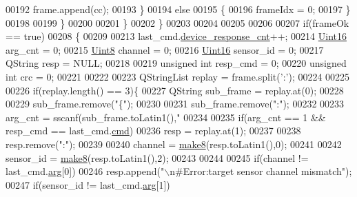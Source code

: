 \begin{DoxyCode}
{00192                                        frame.append(cc);
00193                                    \}
00194                                    \textcolor{keywordflow}{else}
00195                                    \{
00196                                        frameIdx = 0;
00197                                    \}
00198 
00199                       \}
00200 
00201                  \}
00202             \}
00203        
00204 
00205 
00206 
00207         \textcolor{keywordflow}{if}(frameOk == \textcolor{keyword}{true})
00208         \{
00209 
00213             last\_cmd.\hyperlink{a00004_a2b37e66e2555cf1dc26439ad7c30ea78}{device\_response\_cnt}++;
00214             \hyperlink{a00004_aae7407b021d43f7193a81a58cfb3e297}{Uint16}  arg\_cnt      =   0;
00215             \hyperlink{a00004_a979e3e23b9a449e69ab6a8a83b6042f8}{Uint8}   channel      =   0;
00216             \hyperlink{a00004_aae7407b021d43f7193a81a58cfb3e297}{Uint16}  sensor\_id    =   0;
00217             QString resp         =   NULL;
00218 
00219             \textcolor{keywordtype}{unsigned} \textcolor{keywordtype}{int}  resp\_cmd     =   0;
00220             \textcolor{keywordtype}{unsigned} \textcolor{keywordtype}{int}  crc          =   0;
00221 
00222 
00223           QStringList replay     = frame.split(\textcolor{charliteral}{':'});
00224 
00225 
00226           \textcolor{keywordflow}{if}(replay.length() == 3)\{
00227           QString     sub\_frame  = replay.at(0);
00228 
00229           sub\_frame.remove(\textcolor{stringliteral}{"\{"});
00230 
00231           sub\_frame.remove(\textcolor{stringliteral}{":"});
00232 
00233           arg\_cnt = sscanf(sub\_frame.toLatin1(),\textcolor{stringliteral}{"%
00234 
00235           \textcolor{keywordflow}{if}(arg\_cnt == 1 && resp\_cmd == last\_cmd.\hyperlink{a00004_af20664dc9ca2b752c73d524edee0e07a}{cmd})
00236               resp = replay.at(1);
00237 
00238           resp.remove(\textcolor{stringliteral}{":"});
00239 
00240           channel    = \hyperlink{a00017_aebce94d5e6af7afff661daf74b208de1}{make8}(resp.toLatin1(),0);
00241 
00242           sensor\_id  = \hyperlink{a00017_aebce94d5e6af7afff661daf74b208de1}{make8}(resp.toLatin1(),2);
00243 
00244 
00245           \textcolor{keywordflow}{if}(channel != last\_cmd.\hyperlink{a00004_a56e6c2d7315d0ae60a51e8b140c9cfe4}{arg}[0])
00246               resp.append(\textcolor{stringliteral}{"\(\backslash\)n#Error:target sensor channel mismatch"});
00247           \textcolor{keywordflow}{if}(sensor\_id != last\_cmd.\hyperlink{a00004_a56e6c2d7315d0ae60a51e8b140c9cfe4}{arg}[1])
}}
\end{DoxyCode}
